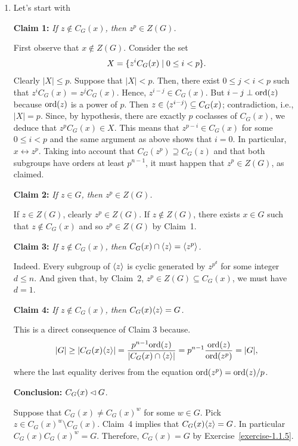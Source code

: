 \begin{solution}
\begin{enumerate}[\upshape a)]
    \item Let's start with 
    
    \textbf{Claim 1:} \textit{If\/ $z\notin C_G(x)$, then\/ $z^p\in Z(G)$.}
    
    First observe that $x\notin Z(G)$. Consider the set
    $$
        X = \{z^iC_G(x)\mid 0\le i<p\}.
    $$
    Clearly $|X|\le p$. Suppose that $|X|<p$. Then, there exist $0\le j<i<p$ such that $z^iC_G(x)=z^jC_G(x)$. Hence, $z^{i-j}\in C_G(x)$. But $i-j\perp{\rm ord}(z)$ because ${\rm ord}(z)$ is a power of $p$. Then $z\in\langle z^{i-j}\rangle\subseteq C_G(x)$; contradiction, i.e., $|X|=p$. Since, by hypothesis, there are exactly $p$ coclasses of $C_G(x)$, we deduce that $z^pC_G(x)\in X$. This means that $z^{p-i}\in C_G(x)$ for some $0\le i<p$ and the same argument as above shows that $i=0$. In particular, $x\leftrightarrow z^p$. Taking into account that $C_G(z^p)\supseteq C_G(z)$ and that both subgroups have orders at least $p^{n-1}$, it must happen that $z^p\in Z(G)$, as claimed.


    \textbf{Claim 2:} \textit{If\/ $z\in G$, then $z^p\in Z(G)$.}

    If $z\in Z(G)$, clearly $z^p\in Z(G)$. If $z\notin Z(G)$, there exists $x\in G$ such that $z\notin C_G(x)$ and so $z^p\in Z(G)$ by Claim~1.

    \textbf{Claim 3:} \textit{If\/ $z\notin C_G(x)$, then\/ $C_G(x)\cap\langle z\rangle = \langle z^p\rangle$.}
    
    Indeed. Every subgroup of $\langle z\rangle$ is cyclic generated by $z^{p^d}$ for some integer $d\le n$. And given that, by Claim~2, $z^p\in Z(G)\subseteq C_G(x)$, we must have $d=1$.
    
    \textbf{Claim 4:} \textit{If\/ $z\notin C_G(x)$, then\/ $C_G(x)\langle z\rangle=G$.}
    
    This is a direct consequence of Claim 3 because.
    $$
        |G| \ge |C_G(x)\langle z\rangle|
            = \frac{p^{n-1}{\rm ord}(z)}{|C_G(x)\cap\langle z\rangle|}
            = p^{n-1}\frac{{\rm ord}(z)}{{\rm ord}(z^p)} = |G|,
    $$
    where the last equality derives from the equation ${\rm ord}(z^p)={\rm ord}(z)/p$.

    \textbf{Conclusion:} $C_G(x)\lhd G$.

    Suppose that $C_G(x)\ne C_G(x)^w$ for some $w\in G$. Pick $z\in C_G(x)^w\setminus C_G(x)$.  Claim~4 implies that $C_G(x)\langle z\rangle=G$. In particular $C_G(x)C_G(x)^w=G$. Therefore, $C_G(x)=G$ by Exercise~\ref{exercise-1.1.5}.


\end{enumerate}
\end{solution}

